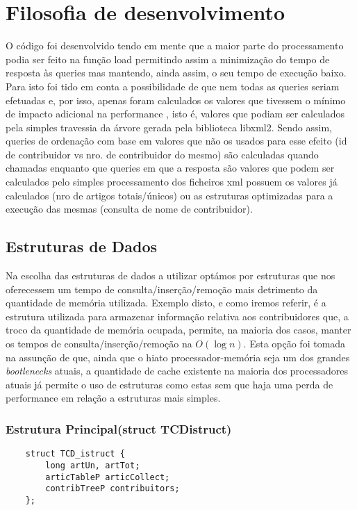 \documentclass{report}
\begin{document}
\section{Filosofia de desenvolvimento}
O código foi desenvolvido tendo em mente que a maior parte do processamento podia ser feito na função load permitindo assim a minimização do tempo de resposta às queries mas mantendo, ainda assim, o seu tempo de execução baixo. Para isto foi tido em conta a possibilidade de que nem todas as queries seriam efetuadas e, por isso, apenas foram calculados os valores que tivessem o mínimo de impacto adicional na performance , isto é, valores que podiam ser calculados pela simples travessia da árvore gerada pela biblioteca libxml2. Sendo assim, queries de ordenação com base em valores que não os usados para esse efeito (id de contribuidor vs nro. de contribuidor do mesmo) são calculadas quando chamadas enquanto que queries em que a resposta são valores que podem ser calculados pelo simples processamento dos ficheiros xml possuem os valores já calculados (nro de artigos totais/únicos) ou as estruturas optimizadas para a execução das mesmas (consulta de nome de contribuidor).

\subsection{Estruturas de Dados}
Na escolha das estruturas de dados a utilizar optámos por estruturas que nos oferecessem um tempo de consulta/inserção/remoção mais detrimento da quantidade de memória utilizada. Exemplo disto, e como iremos referir, é a estrutura utilizada para armazenar informação relativa aos contribuidores que, a troco da quantidade de memória ocupada, permite, na maioria dos casos, manter os tempos de consulta/inserção/remoção na $O(\log{}n)$. Esta opção foi tomada na assunção de que, ainda que o hiato processador-memória seja um dos grandes \textit{bootlenecks} atuais, a quantidade de cache existente na maioria dos processadores atuais já permite o uso de estruturas como estas sem que haja uma perda de performance em relação a estruturas mais simples.

\subsubsection{Estrutura Principal(struct TCDistruct)}

\begin{verbatim}
    struct TCD_istruct {
        long artUn, artTot;
        articTableP articCollect;
        contribTreeP contribuitors;
    };
\end{verbatim}
\end{document}
